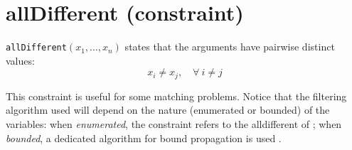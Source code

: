 \label{alldifferent}
\hypertarget{alldifferent}{}

\section{allDifferent (constraint)}\label{alldifferent:alldifferentconstraint}\hypertarget{alldifferent:alldifferentconstraint}{}
\begin{notedef}
  \texttt{allDifferent}$(x_1,\ldots,x_n)$ states that the arguments have pairwise distinct values:
 $$x_i \neq x_j,\quad \forall\ i\neq j$$  
\end{notedef}
This constraint is useful for some matching problems.
Notice that the filtering algorithm used will depend on the nature (enumerated or bounded) of the variables: 
when \emph{enumerated}, the constraint refers to the alldifferent of \cite{ReginAAAI94};
when \emph{bounded}, a dedicated algorithm for bound propagation is used \cite{LopezIJCAI03}.

